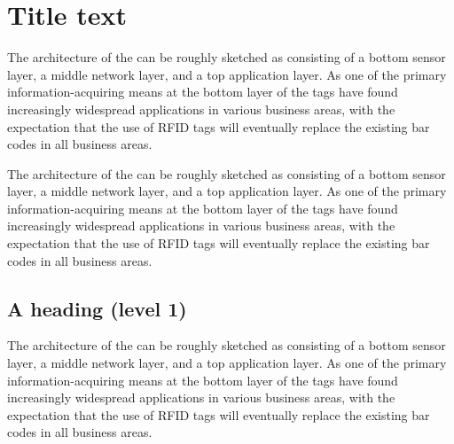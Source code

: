 \documentclass[10pt]{ietbook}
\begin{document}



\chapter{Title text}

The architecture of the can be roughly sketched
as consisting of a bottom sensor layer, a middle network layer, and a
top application layer. As one of the primary information-acquiring means
at the bottom layer of the
tags have found increasingly widespread applications in various business
areas, with the expectation that the use of RFID tags will eventually
replace the existing bar codes in all business areas. 

The architecture of the can be roughly sketched
as consisting of a bottom sensor layer, a middle network layer, and a
top application layer. As one of the primary information-acquiring means
at the bottom layer of the
tags have found increasingly widespread applications in various business
areas, with the expectation that the use of RFID tags will eventually
replace the existing bar codes in all business areas. 

\section{A heading (level 1)}

The architecture of the can be roughly sketched
as consisting of a bottom sensor layer, a middle network layer, and a
top application layer. As one of the primary information-acquiring means
at the bottom layer of the
tags have found increasingly widespread applications in various business
areas, with the expectation that the use of RFID tags will eventually
replace the existing bar codes in all business areas.
\end{document}
